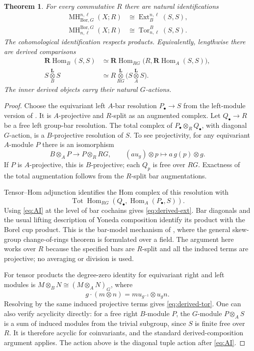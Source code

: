 \documentclass[11pt,a4paper]{article}
\numberwithin{equation}{section}
\newtheorem{theorem}{Theorem}[section]
\theoremstyle{definition}
\theoremstyle{remark}
\newcommand{\G}{G}
\newcommand{\MH}{\operatorname{MH}}
\newcommand{\Tor}{\operatorname{Tor}}
\newcommand{\Ext}{\operatorname{Ext}}
\newcommand{\Hom}{\operatorname{Hom}}
\newcommand{\RHom}{\mathbf{R}\!\operatorname{Hom}}
\newcommand{\Tot}{\operatorname{Tot}}
\newcommand{\derivedtensor}[1]{\mathbin{\mathop{\otimes}\limits^{\mathbf L}_{#1}}}
\newcommand{\Bor}{\mathrm{Bor}}
\begin{document}
\begin{theorem}\label{thm:borel-skew}
 For every commutative $R$ there are natural identifications
 \begin{align}
  \MH^{n,\ell}_{\Bor,\G}(X;R)&\cong\Ext_B^{n,\ell}(S,S),\label{eq:borel-ext}\\
  \MH^{\Bor,\G}_{n,\ell}(X;R)&\cong\Tor^B_{n,\ell}(S,S).\label{eq:borel-tor}
 \end{align}
 The cohomological identification respects products.  Equivalently,
 lengthwise there are derived comparisons
 \begin{align}
  \RHom_B(S,S)&\simeq
   \RHom_{R\G}\bigl(R,\RHom_A(S,S)\bigr),\label{eq:derived-ext}\\
  S\derivedtensor{B} S&\simeq
   R\derivedtensor{R\G}\bigl(S\derivedtensor{A} S\bigr).
       \label{eq:derived-tor}
 \end{align}
 The inner derived objects carry their natural $\G$-actions.
\end{theorem}
\begin{proof}
Choose the equivariant left $A$-bar resolution $P_\bullet\to S$
from the left-module version of \cite[Remark 5.4, \S5.3]{AI}.  It is
$A$-projective and $R$-split as an augmented complex.  Let
$Q_\bullet\to R$ be a free left group-bar resolution.  The total complex
of $P_\bullet\otimes_R Q_\bullet$, with diagonal $\G$-action, is a
$B$-projective resolution of $S$.  To see projectivity, for any
equivariant $A$-module $P$ there is an isomorphism
\[
 B\otimes_A P\longrightarrow P\otimes_R R\G,
 \qquad (a u_g)\otimes p\longmapsto a\,g(p)\otimes g.
\]
If $P$ is $A$-projective, this is $B$-projective; each $Q_p$ is free
over $R\G$.  Exactness of the total augmentation follows from the
$R$-split bar augmentations.

Tensor--Hom adjunction identifies the Hom complex of this resolution
with
\[
 \Tot\Hom_{R\G}(Q_\bullet,\Hom_A(P_\bullet,S)).
\]
Using \eqref{eq:AI} at the level of bar cochains gives
\eqref{eq:derived-ext}.  Bar diagonals and the usual lifting
description of Yoneda composition identify its product with the
Borel cup product.  This is the bar-model mechanism of
\cite[Theorem 7.5 and Corollary 7.7]{Negron}, where the general
skew-group change-of-rings theorem is formulated over a field.  The argument here
works over $R$ because the specified bars are $R$-split and all the
induced terms are projective; no averaging or division is used.

For tensor products the degree-zero identity for equivariant right
and left modules is
$M\otimes_B N\cong(M\otimes_A N)_\G$, where
\[
 g\cdot(m\otimes n)=m u_{g^{-1}}\otimes u_g n.
\]
Resolving by the same induced projective terms gives
\eqref{eq:derived-tor}.  One can also verify acyclicity directly:
for a free right $B$-module $P$, the $\G$-module $P\otimes_A S$ is a
sum of induced modules from the trivial subgroup, since $S$ is finite
free over $R$.  It is therefore acyclic for coinvariants, and the
standard derived-composition argument applies.  The action above is
the diagonal tuple action after \eqref{eq:AI}.
\end{proof}
\end{document}
